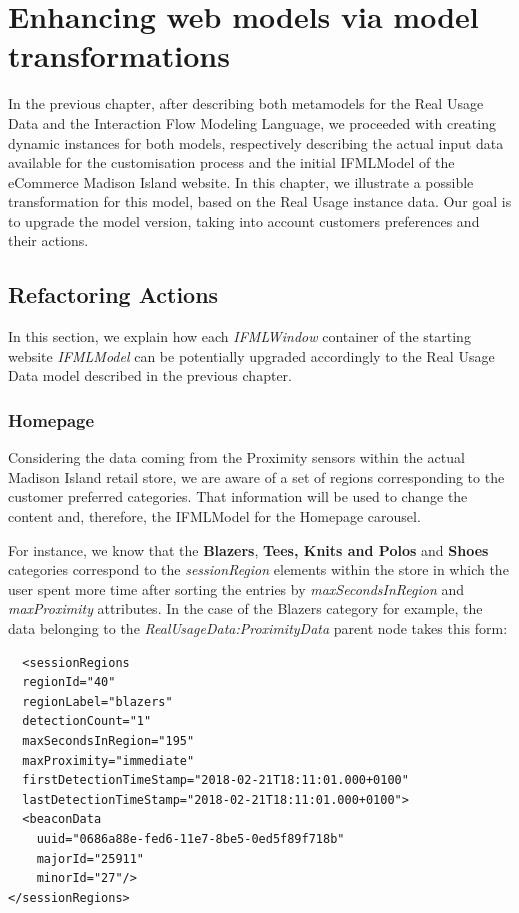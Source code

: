 \chead{}

\chapter{Enhancing web models via model transformations}
\label{enhancing-web-models-via-model-transformations}

In the previous chapter, after describing both metamodels for the Real Usage Data and the Interaction Flow Modeling Language, we proceeded with creating dynamic instances for both models, respectively describing the actual input data available for the customisation process and the initial IFMLModel of the eCommerce Madison Island website. In this chapter, we illustrate a possible transformation for this model, based on the Real Usage instance data. Our goal is to upgrade the model version, taking into account customers preferences and their actions.


\section{Refactoring Actions}

In this section, we explain how each \textit{IFMLWindow} container of the starting website \textit{IFMLModel} can be potentially upgraded accordingly to the Real Usage Data model described in the previous chapter.

\subsection{Homepage}
\label{homepage-updates}

Considering the data coming from the Proximity sensors within the actual Madison Island retail store, we are aware of a set of regions corresponding to the customer preferred categories. That information will be used to change the content and, therefore, the IFMLModel for the Homepage carousel.

For instance, we know that the \textbf{Blazers}, \textbf{Tees, Knits and Polos} and \textbf{Shoes} categories correspond to the \textit{sessionRegion} elements within the store in which the user spent more time after sorting the entries by \textit{maxSecondsInRegion} and \textit{maxProximity} attributes. In the case of the Blazers category for example, the data belonging to the \textit{RealUsageData:ProximityData} parent node takes this form:

\vspace{0.5cm}
\lstset{language=XML}
\begin{lstlisting} 
  <sessionRegions
  regionId="40"
  regionLabel="blazers"
  detectionCount="1"
  maxSecondsInRegion="195"
  maxProximity="immediate"
  firstDetectionTimeStamp="2018-02-21T18:11:01.000+0100"
  lastDetectionTimeStamp="2018-02-21T18:11:01.000+0100">
  <beaconData
    uuid="0686a88e-fed6-11e7-8be5-0ed5f89f718b"
    majorId="25911"
    minorId="27"/>
</sessionRegions>
\end{lstlisting}
\vspace{0.5cm}

